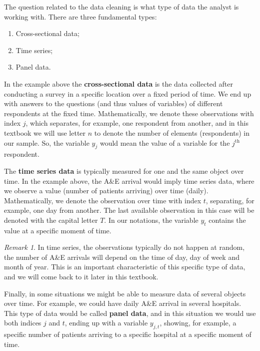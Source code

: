 \documentclass[
]{book}
\providecommand{\tightlist}{%
  \setlength{\itemsep}{0pt}\setlength{\parskip}{0pt}}
\theoremstyle{definition}
\theoremstyle{definition}
\theoremstyle{definition}
\theoremstyle{definition}
\theoremstyle{remark}
\newtheorem*{remark}{Remark}
\begin{document}
The question related to the data cleaning is what type of data the analyst is working with. There are three fundamental types:

\begin{enumerate}
\def\labelenumi{\arabic{enumi}.}
\tightlist
\item
  Cross-sectional data;
\item
  Time series;
\item
  Panel data.
\end{enumerate}

In the example above the \textbf{cross-sectional data} is the data collected after conducting a survey in a specific location over a fixed period of time. We end up with answers to the questions (and thus values of variables) of different respondents at the fixed time. Mathematically, we denote these observations with index \(j\), which separates, for example, one respondent from another, and in this textbook we will use letter \(n\) to denote the number of elements (respondents) in our sample. So, the variable \(y_j\) would mean the value of a variable for the \(j^{\mathrm{th}}\) respondent.

The \textbf{time series data} is typically measured for one and the same object over time. In the example above, the A\&E arrival would imply time series data, where we observe a value (number of patients arriving) over time (daily). Mathematically, we denote the observation over time with index \(t\), separating, for example, one day from another. The last available observation in this case will be denoted with the capital letter \(T\). In our notations, the variable \(y_t\) contains the value at a specific moment of time.

\begin{remark}
In time series, the observations typically do not happen at random, the number of A\&E arrivals will depend on the time of day, day of week and month of year. This is an important characteristic of this specific type of data, and we will come back to it later in this textbook.
\end{remark}

Finally, in some situations we might be able to measure data of several objects over time. For example, we could have daily A\&E arrival in several hospitals. This type of data would be called \textbf{panel data}, and in this situation we would use both indices \(j\) and \(t\), ending up with a variable \(y_{j,t}\), showing, for example, a specific number of patients arriving to a specific hospital at a specific moment of time.
\end{document}
